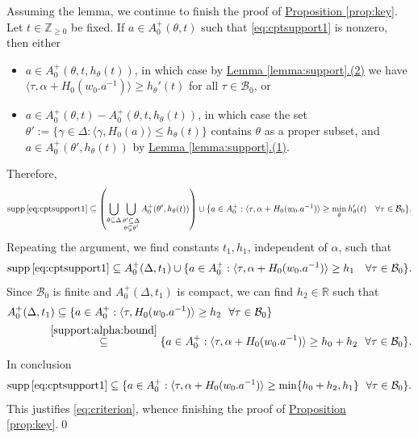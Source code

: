 \documentclass[10pt]{amsart}
\theoremstyle{definition}
\numberwithin{equation}{section}
\DeclareMathOperator{\supp}{\mathrm{supp}}
\numberwithin{equation}{subsection}
\newcommand{\RR}{\mathbb{R}}
\newcommand{\calB}{\mathcal{B}}
\begin{document}
Assuming the lemma, we continue to finish the proof of \hyperref[prop:key]{Proposition \ref{prop:key}}. Let $t\in\mathbb{Z}_{\geq 0}$ be fixed. If $a\in A_0^+(\theta,t)$ such that \eqref{eq:cptsupport1} is nonzero, then either
\begin{itemize}
    \item $a\in A_0^+(\theta,t,h_\theta(t))$, in which case by \hyperref[lemma:support]{Lemma \ref{lemma:support}.(2)} we have  $\langle\tau,\alpha+H_0(w_0.a^{-1})\rangle\geq h_\theta'(t)$ for all $\tau\in\mathcal{B}_0$, or
    \item $a\in A_0^+(\theta,t) - A_0^+(\theta,t,h_\theta(t))$, in which case the set $\theta':=\{\gamma\in\Delta : \langle\gamma,H_0(a)\rangle\leq h_\theta(t)\}$ contains $\theta$ as a proper subset, and $a\in A_0^+(\theta',h_\theta(t))$ by \hyperref[lemma:support]{Lemma \ref{lemma:support}.(1)}.
\end{itemize}
Therefore,
\begin{align*}
    \supp\eqref{eq:cptsupport1}\subseteq \left(\bigcup_{\theta\subseteq\Delta}\bigcup_{\substack{\theta'\subseteq\Delta\\\theta\subsetneq\theta'}}A_0^+(\theta',h_\theta(t))\right) \cup \{a\in A_0^+: \langle \tau,\alpha+H_0(w_0.a^{-1})\rangle\ge \min_\theta h'_{\theta}(t)\quad  \forall \tau\in \calB_0 \}.
\end{align*}
Repeating the argument, we find constants $t_1,h_1$, independent of $\alpha$, such that
\begin{align*}
    \supp\eqref{eq:cptsupport1} \subseteq A_0^+(\Delta,t_1) \cup \{a\in A_0^+: \langle \tau,\alpha+H_0(w_0.a^{-1})\rangle\ge h_1\quad  \forall \tau\in \calB_0 \}.
\end{align*}
Since $\mathcal{B}_0$ is finite and $A_0^+(\Delta,t_1)$ is compact, we can find $h_2\in\RR$ such that
\begin{align*}
    A_0^+(\Delta,t_1) &\subseteq \{a\in A_0^+ : \langle\tau,H_0(w_0.a^{-1})\rangle \geq h_2\,\,\,\,\forall\tau\in\mathcal{B}_0\}\\
    &\!\!\!\!\overset{\eqref{support:alpha:bound}}{\subseteq}\{a\in A_0^+ : \langle\tau,\alpha+H_0(w_0.a^{-1})\rangle \geq h_0+h_2\,\,\,\,\forall\tau\in\mathcal{B}_0\}.
\end{align*}
In conclusion
\begin{align*}
    \supp\eqref{eq:cptsupport1} \subseteq \{a\in A_0^+ : \langle\tau,\alpha+H_0(w_0.a^{-1})\rangle \geq \min\{h_0+h_2,h_1\}\,\,\,\,\forall\tau\in\mathcal{B}_0\}.
\end{align*}
This justifies \eqref{eq:criterion}, whence finishing the proof of \hyperref[prop:key]{Proposition \ref{prop:key}}.\qed
\end{document}
